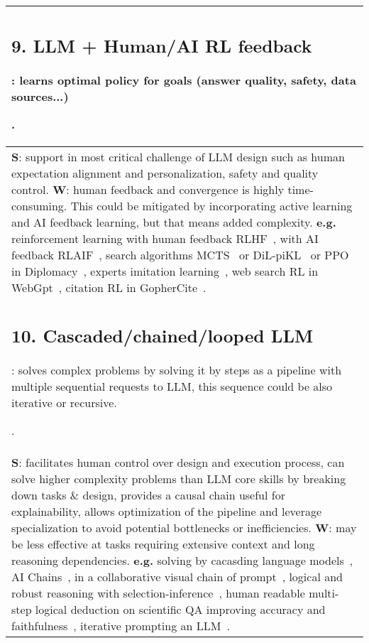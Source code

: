 \documentclass[acmsmall]{acmart}
\begin{document}
{\begin{longtable}{p{1\linewidth}}
{\subsection{9. LLM + Human/AI RL feedback}\label{HP9}:
learns optimal policy for goals (answer quality, safety, data sources...)}. \\\midrule  
{\textbf{S}: support in most critical challenge of LLM design such as human expectation alignment and personalization, safety and quality control.
\newline \textbf{W}:} human feedback and convergence is highly time-consuming. This could be mitigated by incorporating active learning and AI feedback learning, but that means added complexity.
\newline \textbf{e.g.} reinforcement learning with human feedback RLHF~\citep{baiTrainingHelpfulHarmless2022, ouyangTrainingLanguageModels2022, daniels-kochExpertiseProblemLearning2022}, with AI feedback RLAIF~\citep{baiConstitutionalAIHarmlessness2022}, search algorithms MCTS~\citep{yeSpendingThinkingTime2021, laurentLearningFindProofs2022} or DiL-piKL~\citep{bakhtinMasteringGameNoPress2022} or PPO in Diplomacy~\citep{bakhtinMasteringGameNoPress2022}, experts imitation learning~\citep{yangChainThoughtImitation2022}, web search RL in WebGpt~\citep{nakanoWebGPTBrowserassistedQuestionanswering2022}, citation RL in GopherCite~\citep{menickTeachingLanguageModels2022}. \\\midrule

{\subsection{10. Cascaded/chained/looped LLM}\label{HP10}:
solves complex problems by solving it by steps as a pipeline with multiple sequential requests to LLM, this sequence could be also iterative or recursive.}. \\\midrule  
{\textbf{S}: facilitates human control over design and execution process, can solve higher complexity problems than LLM core skills by breaking down tasks \& design, provides a causal chain useful for explainability, allows optimization of the pipeline and leverage specialization to avoid potential bottlenecks or inefficiencies.
\newline \textbf{W}:} may be less effective at tasks requiring extensive context and long reasoning dependencies. \newline \textbf{e.g.} solving by cacasding language models~\citep{dohanLanguageModelCascades2022}, AI Chains~\citep{wuAIChainsTransparent2022}, in a collaborative visual chain of prompt~\citep{wuPromptChainerChainingLarge2022}, logical and robust reasoning with selection-inference~\citep{creswellSelectionInferenceExploitingLarge2022}, human readable multi-step logical deduction on scientific QA improving accuracy and faithfulness~\citep{creswellFaithfulReasoningUsing2022}, iterative prompting an LLM~\citep{wangIterativelyPromptPretrained2022, yangRe3GeneratingLonger2022, duaSuccessivePromptingDecomposing2022}. \\\midrule


\end{longtable}}
\end{document}
